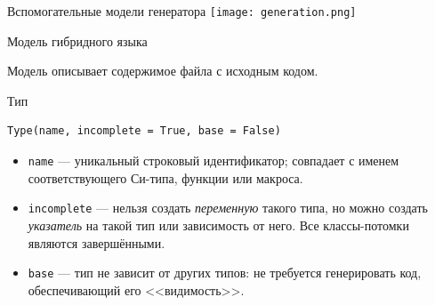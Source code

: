 \documentclass[unicode,hyperref={unicode=true}]{beamer}
\theoremstyle{definition}
\theoremstyle{plain}
\begin{document}
\begin{frame}{Вспомогательные модели генератора}
\texttt{[image: generation.png]}
\end{frame}



\begin{frame}{Модель гибридного языка}

\vfill
Модель описывает содержимое файла с исходным кодом.
\end{frame}



\begin{frame}[fragile]{Тип}
\lstset{language=Python}
\begin{lstlisting}
Type(name, incomplete = True, base = False)
\end{lstlisting}
\vfill
\begin{itemize}
\item \texttt{name} --- уникальный строковый идентификатор; совпадает с
    именем соответствующего Си-типа, функции или макроса.
\item \texttt{incomplete} --- нельзя создать \textit{переменную} такого типа, но
    можно создать \textit{указатель} на такой тип или зависимость от него. Все
    классы-потомки являются завершёнными.
\item \texttt{base} --- тип не зависит от других типов: не требуется
    генерировать код, обеспечивающий его <<видимость>>.
\end{itemize}
\end{frame}
\end{document}
